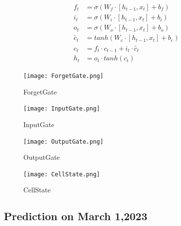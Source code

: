 \documentclass{mcmthesis}  %
\begin{document}
\begin{equation} 
\begin{aligned}
        f_{t} &=\sigma(W_{f}\cdot [h_{t-1},x_{t}]+b_{f})\\
        i_{t} &=\sigma(W_{i}\cdot [h_{t-1},x_{t}]+b_{i}) \\
        o_{t} &=\sigma(W_{o}\cdot [h_{t-1},x_{t}]+b_{o}) \\
        \tilde{c_{t}} &=tanh(W_{c}\cdot [h_{t-1},x_{t}]+b_{c})\\
        c_{t} &=f_{t}\cdot c_{t-1}+i_{t}\cdot \tilde{c_{t}} \\
        h_{t} &=o_{t}\cdot tanh(c_{t})
\end{aligned}
\end{equation} 

\begin{figure}[h]  %
        \centering  %
        \begin{minipage}[c]{0.48\textwidth}  %
        \centering  %
        \texttt{[image: ForgetGate.png]}  %
        \caption{ForgetGate} \label{Figure5}  %
        \end{minipage}  %
        \hspace{0.02\textwidth}
        \begin{minipage}[c]{0.48\textwidth}  %
        \centering  %
        \texttt{[image: InputGate.png]}  %
        \caption{InputGate} \label{Figure6}  %
        \end{minipage}  %
        \hspace{0.02\textwidth}
        \begin{minipage}[c]{0.48\textwidth}  %
        \centering  %
        \texttt{[image: OutputGate.png]}  %
        \caption{OutputGate} \label{Figure5}  %
        \end{minipage}  %
        \hspace{0.02\textwidth}
        \begin{minipage}[c]{0.48\textwidth}  %
        \centering  %
        \texttt{[image: CellState.png]}  %
        \caption{CellState} \label{Figure6}  %
        \end{minipage}  %
\end{figure}  %
\subsection{Prediction on March 1,2023}
\end{document}
